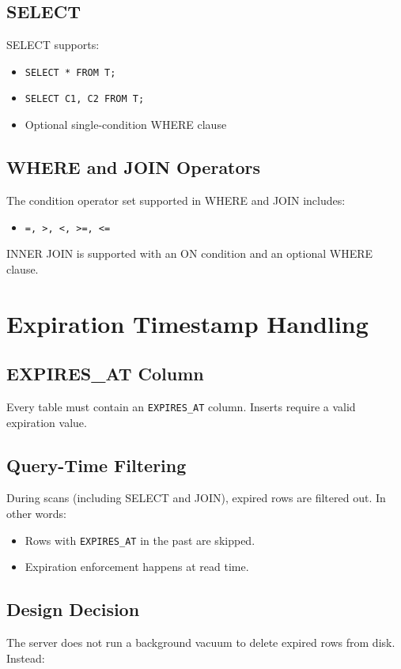 \documentclass[11pt]{article}
\begin{document}
\subsection{SELECT}
SELECT supports:

\begin{itemize}[leftmargin=*]
\item \texttt{SELECT * FROM T;}
\item \texttt{SELECT C1, C2 FROM T;}
\item Optional single-condition WHERE clause
\end{itemize}

\subsection{WHERE and JOIN Operators}
The condition operator set supported in WHERE and JOIN includes:

\begin{itemize}[leftmargin=*]
\item \texttt{=, >, <, >=, <=}
\end{itemize}

INNER JOIN is supported with an ON condition and an optional WHERE clause.

\section{Expiration Timestamp Handling}
\subsection{EXPIRES\_AT Column}
Every table must contain an \texttt{EXPIRES\_AT} column. Inserts require a valid expiration value.

\subsection{Query-Time Filtering}
During scans (including SELECT and JOIN), expired rows are filtered out. In other words:

\begin{itemize}[leftmargin=*]
\item Rows with \texttt{EXPIRES\_AT} in the past are skipped.
\item Expiration enforcement happens at read time.
\end{itemize}

\subsection{Design Decision}
The server does not run a background vacuum to delete expired rows from disk. Instead:
\end{document}
